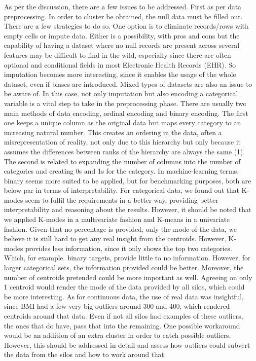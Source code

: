 As per the discussion, there are a few issues to be addressed. First as per data preprocessing. In order to cluster be obtained, the null data must be filled out. There are a few strategies to do so. One option is to eliminate records/rows with empty cells or impute data. Either is a possibility, with pros and cons but the capability of having a dataset where no null records are present across several features may be difficult to find in the wild, especially since there are often optional and conditional fields in most Electronic Health Records (EHR). So imputation becomes more interesting, since it enables the usage of the whole dataset, even if biases are introduced.
Mixed types of datasets are also an issue to be aware of. In this case, not only imputation but also encoding a categorical variable is a vital step to take in the preprocessing phase. There are usually two main methods of data encoding, ordinal encoding and binary encoding. The first one keeps a unique column as the original data but maps every category to an increasing natural number. This creates an ordering in the data, often a misrepresentation of reality, not only due to this hierarchy but only because it assumes the differences between ranks of the hierarchy are always the same (1). The second is related to expanding the number of columns into the number of categories and creating 0s and 1s for the category. In machine-learning terms, binary seems more suited to be applied, but for benchmarking purposes, both are below par in terms of interpretability. For categorical data, we found out that K-modes seem to fulfil the requirements in a better way, providing better interpretability and reasoning about the results. However, it should be noted that we applied K-modes in a multivariate fashion and K-means in a univariate fashion.
Given that no percentage is provided, only the mode of the data, we believe it is still hard to get any real insight from the centroids. However, K-modes provides less information, since it only shows the top two categories. Which, for example. binary targets, provide little to no information. However, for larger categorical sets, the information provided could be better. Moreover, the number of centroids pretended could be more important as well. Agreeing on only 1 centroid would render the mode of the data provided by all silos, which could be more interesting.
As for continuous data, the use of real data was insightful, since BMI had a few very big outliers around 300 and 400, which rendered centroids around that data. Even if not all silos had examples of these outliers, the ones that do have, pass that into the remaining. One possible workaround would be an addition of an extra cluster in order to catch possible outliers.
However, this should be addressed in detail and assess how outliers could subvert the data from the silos and how to work around that.

